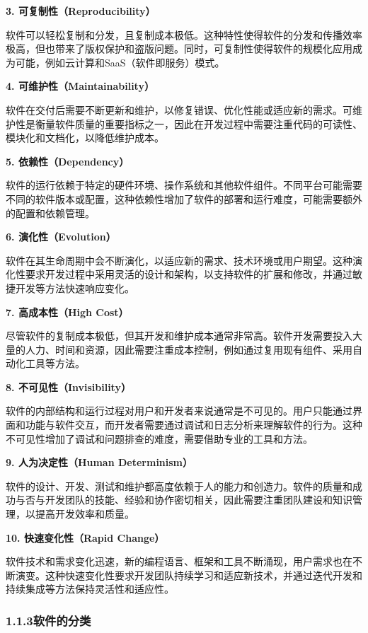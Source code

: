 \documentclass[12pt,a4paper]{article}
\begin{document}
\textbf{3. 可复制性（Reproducibility）}

软件可以轻松复制和分发，且复制成本极低。这种特性使得软件的分发和传播效率极高，但也带来了版权保护和盗版问题。同时，可复制性使得软件的规模化应用成为可能，例如云计算和SaaS（软件即服务）模式。

\textbf{4. 可维护性（Maintainability）}

软件在交付后需要不断更新和维护，以修复错误、优化性能或适应新的需求。可维护性是衡量软件质量的重要指标之一，因此在开发过程中需要注重代码的可读性、模块化和文档化，以降低维护成本。

\textbf{5. 依赖性（Dependency）}

软件的运行依赖于特定的硬件环境、操作系统和其他软件组件。不同平台可能需要不同的软件版本或配置，这种依赖性增加了软件的部署和运行难度，可能需要额外的配置和依赖管理。

\textbf{6. 演化性（Evolution）}

软件在其生命周期中会不断演化，以适应新的需求、技术环境或用户期望。这种演化性要求开发过程中采用灵活的设计和架构，以支持软件的扩展和修改，并通过敏捷开发等方法快速响应变化。

\textbf{7. 高成本性（High Cost）}

尽管软件的复制成本极低，但其开发和维护成本通常非常高。软件开发需要投入大量的人力、时间和资源，因此需要注重成本控制，例如通过复用现有组件、采用自动化工具等方法。

\textbf{8. 不可见性（Invisibility）}

软件的内部结构和运行过程对用户和开发者来说通常是不可见的。用户只能通过界面和功能与软件交互，而开发者需要通过调试和日志分析来理解软件的行为。这种不可见性增加了调试和问题排查的难度，需要借助专业的工具和方法。

\textbf{9. 人为决定性（Human Determinism）}

软件的设计、开发、测试和维护都高度依赖于人的能力和创造力。软件的质量和成功与否与开发团队的技能、经验和协作密切相关，因此需要注重团队建设和知识管理，以提高开发效率和质量。

\textbf{10. 快速变化性（Rapid Change）}

软件技术和需求变化迅速，新的编程语言、框架和工具不断涌现，用户需求也在不断演变。这种快速变化性要求开发团队持续学习和适应新技术，并通过迭代开发和持续集成等方法保持灵活性和适应性。

\subsubsection{1.1.3软件的分类}\label{ux8f6fux4ef6ux7684ux5206ux7c7b}
\end{document}
